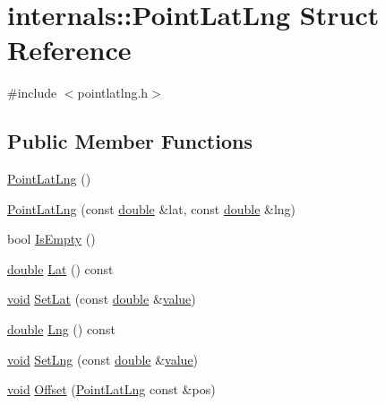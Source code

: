 \hypertarget{structinternals_1_1_point_lat_lng}{\section{internals\-:\-:Point\-Lat\-Lng Struct Reference}
\label{structinternals_1_1_point_lat_lng}
}


{\ttfamily \#include $<$pointlatlng.\-h$>$}

\subsection*{Public Member Functions}
\begin{DoxyCompactItemize}
\item 
\hyperlink{group___o_p_map_widget_ga1e0b690c0014f60cf7b9444345110709}{Point\-Lat\-Lng} ()
\item 
\hyperlink{group___o_p_map_widget_ga9d9ccecdc15490db949e762a8d5bfd25}{Point\-Lat\-Lng} (const \hyperlink{_super_l_u_support_8h_a8956b2b9f49bf918deed98379d159ca7}{double} \&lat, const \hyperlink{_super_l_u_support_8h_a8956b2b9f49bf918deed98379d159ca7}{double} \&lng)
\item 
bool \hyperlink{group___o_p_map_widget_gadcc729a47d0615eb914a429e90acc041}{Is\-Empty} ()
\item 
\hyperlink{_super_l_u_support_8h_a8956b2b9f49bf918deed98379d159ca7}{double} \hyperlink{group___o_p_map_widget_gacf58e663626e5a88876d68937505dc64}{Lat} () const 
\item 
\hyperlink{group___u_a_v_objects_plugin_ga444cf2ff3f0ecbe028adce838d373f5c}{void} \hyperlink{group___o_p_map_widget_ga800a9e0154cc69ea20a677726a3a82c9}{Set\-Lat} (const \hyperlink{_super_l_u_support_8h_a8956b2b9f49bf918deed98379d159ca7}{double} \&\hyperlink{glext_8h_aa0e2e9cea7f208d28acda0480144beb0}{value})
\item 
\hyperlink{_super_l_u_support_8h_a8956b2b9f49bf918deed98379d159ca7}{double} \hyperlink{group___o_p_map_widget_ga2a02db7101a66a3c2e5f536e60b38423}{Lng} () const 
\item 
\hyperlink{group___u_a_v_objects_plugin_ga444cf2ff3f0ecbe028adce838d373f5c}{void} \hyperlink{group___o_p_map_widget_gaa211add3899eb9c7ca5f82fad953461c}{Set\-Lng} (const \hyperlink{_super_l_u_support_8h_a8956b2b9f49bf918deed98379d159ca7}{double} \&\hyperlink{glext_8h_aa0e2e9cea7f208d28acda0480144beb0}{value})
\item 
\hyperlink{group___u_a_v_objects_plugin_ga444cf2ff3f0ecbe028adce838d373f5c}{void} \hyperlink{group___o_p_map_widget_ga3ad4201693b6e3add6b7ad1b9ff2e473}{Offset} (\hyperlink{structinternals_1_1_point_lat_lng}{Point\-Lat\-Lng} const \&pos)

\end{DoxyCompactItemize}
